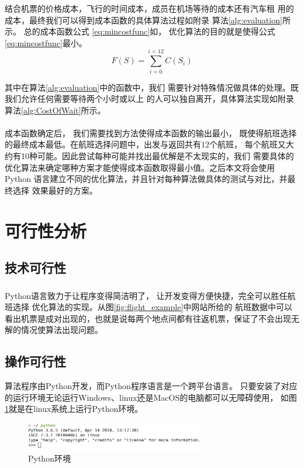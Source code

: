 \documentclass[fontset=fandol,a4paper,zihao=5]{ctexart}
\newcommand{\upcite}[1]{\textsuperscript{\textsuperscript{\cite{#1}}}}
\renewcommand{\eqref}[1]{公式 \ref{#1}}
\begin{document}
			结合机票的价格成本，飞行的时间成本，成员在机场等待的成本还有汽车租
            用的成本，最终我们可以得到成本函数的具体算法过程如附录
            算法\ref{alg:evaluation}所示。
            总的成本函数\eqref{eq:mincostfunc}如，
            优化算法的目的就是使得\eqref{eq:mincostfunc}最小。
			\begin{equation}
                F(S)=\sum_{i=0}^{i<12}C(S_{i})
                \label{eq:mincostfunc}
			\end{equation}
		
			其中在算法\ref{alg:evaluation}中的函数中，我们
            需要针对特殊情况做具体的处理。既我们允许任何需要等待两个小时或以上
            的人可以独自离开，具体算法实现如附录算法\ref{alg:CostOfWait}所示。
		
		成本函数确定后，
        我们需要找到方法使得成本函数的输出最小\upcite{陈冬芳2005全局最优化算法及其应用}，
        既使得航班选择的最终成本最低。在航班选择问题中，出发与返回共有12个航班，
        每个航班又大约有10种可能。因此尝试每种可能并找出最优解是不太现实的，我们
        需要具体的优化算法来确定哪种方案才能使得成本函数取得最小值。之后本文将会使用Python
        语言建立不同的优化算法，并且针对每种算法做具体的测试与对比，并最终选择 
        效果最好的方案。
	\section{可行性分析}
		\subsection{技术可行性}
			Python语言致力于让程序变得简洁明了，
            让开发变得方便快捷\upcite{Oliphant2007Python}，完全可以胜任航班选择
            优化算法的实现。从图\ref{fig:flight_example}中网站所给的
            航班数据中可以看出机票是成对出现的，也就是说每两个地点间都有往返机票，保证了不会出现无解的情况使算法出现问题。
		\subsection{操作可行性}
			算法程序由Python开发，而Python程序语言是一个跨平台语言。
            只要安装了对应的运行环境无论运行Windows、linux还是MacOS的电脑都可以无障碍使用，
            如图\ref{fig:linux_python}就是在linux系统上运行Python环境。
            \begin{figure}[!h]
                \centering
                \includegraphics[width=0.7\textwidth]{pic/linux_python.png}
                \caption{\label{fig:linux_python}Python环境}
            \end{figure}
\end{document}

